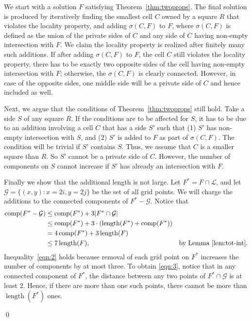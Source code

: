 \documentclass[extras,11pt]{article} \usepackage{fullpage}
\theoremstyle{mytheorem}
\newenvironment{proofof}[1]{\par\noindent{\bf #1.}\hspace{0.5em}}
    {\hfill\qed\vspace{1ex}}
\DeclareMathOperator{\len}{length}
\DeclareMathOperator{\comp}{comp}
\newcommand{\G}{\mathcal{G}}
\newcommand{\eL}{\mathcal{L}}
\begin{document}
\begin{proofof}{\proofname\ of Theorem~\ref{thm:locality}}
We start with a solution $F$ satisfying Theorem~\ref{thm:twoprops}.
The final solution is produced by iteratively finding the smallest cell $C$ owned  by a square $R$ that violates the locality property,
and adding $\sigma(C,F)$ to $F$, where $\sigma(C,F)$ is defined as the union of 
the private sides of $C$
and
any side of $C$ having non-empty intersection with $F$.
We claim the locality property is realized after finitely many such additions.
If after adding $\sigma(C,F)$ to $F$, the cell $C$ still violates the locality property, there has to  be exactly two opposite sides of the cell having non-empty intersection with $F$; otherwise, the $\sigma(C,F)$ is clearly connected.
However, in case of the opposite sides, one middle side will be a private side of $C$ and hence included as well.

Next, we argue that the conditions of Theorem~\ref{thm:twoprops} still hold.
Take a side $S$ of any square $R$.
If the conditions are to be affected for $S$,
it has to be due to an addition involving a cell $C$ that has a side $S'$ such that
(1) $S'$ has non-empty intersection with $S$, and (2) $S'$ is added to $F$ as part of $\sigma(C,F)$.
The condition will be trivial if $S'$ contains $S$.
Thus, we assume that $C$ is a smaller square than $R$.
So $S'$ cannot be a private side of $C$.
However, the number of components on $S$ cannot increase if $S'$ has already an intersection with $F$.


Finally we  show that the additional length is not large.
Let $F^\ast=F\cap \eL$,
and let $\G=\{(x,y): x=2i, y=2j\}$ be the set of all grid points.
We will charge the additions to the connected components of $F^\ast-\G$.
Notice that
\begin{align}
               \comp(F^\ast-\G)
                                 &\leq \comp(F^\ast) + 3|F^\ast\cap\G| \label{eqn:2}\\
                                 &\leq \comp(F^\ast) + 3\cdot(\len(F^\ast) + \comp(F^\ast)) \label{eqn:3}\\
                                 &= 4\comp(F^\ast) + 3\len(F) \nonumber\\&\leq 7\len(F), &\text{by Lemma~\ref{lem:tot-int}}. \label{eqn:5}
\end{align}
Inequality~\eqref{eqn:2} holds because removal of each grid point on $F^\ast$ increases the number of components by at most three.
To obtain \eqref{eqn:3}, notice that in any connected component of $F^\ast$,
the distance between any two points of $F^\ast\cap\G$ is at least $2$.
Hence, if there are more than one such points, there cannot be more than $\len(F^\ast)$ ones.


\end{proofof}
\end{document}
